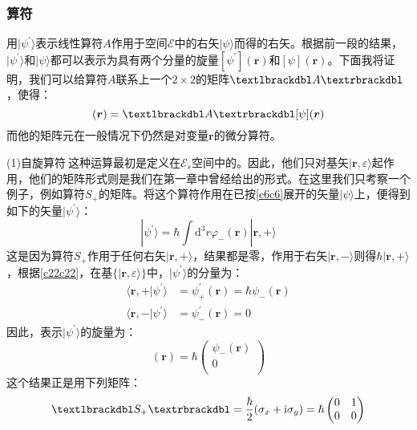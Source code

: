 \documentclass[]{article}
\begin{document}
\subsubsection{算符}
用$|\psi^\prime\rangle$表示线性算符$A$作用于空间$\mathscr{E}$中的右矢$|\psi\rangle$而得的右矢。根据前一段的结果，$|\psi^\prime\rangle$和$|\psi\rangle$都可以表示为具有两个分量的旋量$[\psi^\prime](\boldsymbol{r})$和$[\psi](\boldsymbol{r})$。下面我将证明，我们可以给算符$A$联系上一个$2\times2$的矩阵$\textlbrackdbl A\textrbrackdbl$，使得：
\begin{equation}
	[\psi^\prime](\boldsymbol{r})=\textlbrackdbl A\textrbrackdbl[\psi](\boldsymbol{r})
\end{equation}
而他的矩阵元在一般情况下仍然是对变量$\boldsymbol{r}$的微分算符。\par 
(1)自旋算符$\ $这种运算最初是定义在$\mathscr{E}_s$空间中的。因此，他们只对基矢$|\boldsymbol{r},\varepsilon\rangle$起作用，他们的矩阵形式则是我们在第一章中曾经给出的形式。在这里我们只考察一个例子，例如算符$S_+$的矩阵。将这个算符作用在已按\eqref{c6c6}展开的矢量$|\psi\rangle$上，便得到如下的矢量$|\psi^\prime\rangle$：
\begin{equation}
	|\psi^\prime\rangle=\hbar\int\mathrm{d}^3r\varphi_-(\boldsymbol{r})|\boldsymbol{r},+\rangle
	\label{c22c22}
\end{equation}
这是因为算符$S_+$作用于任何右矢$|\boldsymbol{r},+\rangle$，结果都是零，作用于右矢$|\boldsymbol{r},-\rangle$则得$\hbar|\boldsymbol{r},+\rangle$，根据\eqref{c22c22}，在基$\{|\boldsymbol{r},\varepsilon\rangle\}$中，$|\psi^\prime\rangle$的分量为：
\begin{align}
	\langle\boldsymbol{r},+|\psi^\prime\rangle&=\psi^\prime_+(\boldsymbol{r})=\hbar\psi_-(\boldsymbol{r})\nonumber\\
	\langle\boldsymbol{r},-|\psi^\prime\rangle&=\psi^\prime_-(\boldsymbol{r})=0
\end{align}
因此，表示$|\psi^\prime\rangle$的旋量为：
\begin{equation}
	[\psi^\prime](\boldsymbol{r})=\hbar\begin{pmatrix}
		\psi_-(\boldsymbol{r})\\
		0\\
	\end{pmatrix}
\end{equation}
这个结果正是用下列矩阵：
\begin{equation}
	\textlbrackdbl S_+\textrbrackdbl=\dfrac{\hbar}{2}(\sigma_x+\mathrm{i}\sigma_y)=\hbar\begin{pmatrix}
		0&1\\
		0&0\\
	\end{pmatrix}
\end{equation}
\end{document}
